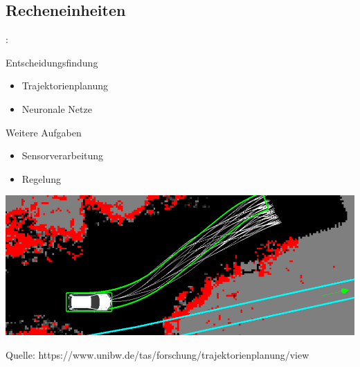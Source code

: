 \documentclass{beamer}
\begin{document}
\subsection{Recheneinheiten}
\begin{frame}{\insertsection: \insertsubsection}
\begin{minipage}{0.35\linewidth}
	
	Entscheidungsfindung
	
	\begin{itemize}
		\item Trajektorienplanung
		\item Neuronale Netze
	\end{itemize}

	Weitere Aufgaben

	\begin{itemize}
		\item Sensorverarbeitung
		\item Regelung
	\end{itemize}
\end{minipage} \quad
\begin{minipage}{0.55\linewidth}
	\includegraphics[width=\linewidth]{trajektorien}
	
	{\tiny Quelle: https://www.unibw.de/tas/forschung/trajektorienplanung/view}
\end{minipage}
\end{frame}
\end{document}
